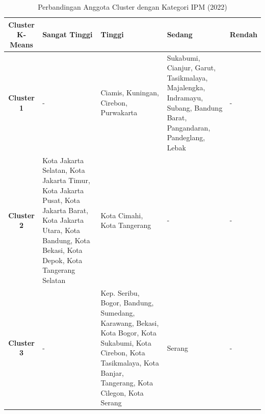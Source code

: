 \begin{table}[H]
\centering
\caption{Perbandingan Anggota Cluster dengan Kategori IPM (2022)} \label{tab:ipm_cross_2022}
\begin{tabular}{|c|p{2cm}|p{2cm}|p{2cm}|p{2cm}|}
\hline
\textbf{Cluster K-Means} & \textbf{Sangat Tinggi} & \textbf{Tinggi} & \textbf{Sedang} & \textbf{Rendah} \\ \hline
\textbf{Cluster 1} & - & Ciamis, Kuningan, Cirebon, Purwakarta & Sukabumi, Cianjur, Garut, Tasikmalaya, Majalengka, Indramayu, Subang, Bandung Barat, Pangandaran, Pandeglang, Lebak & - \\ \hline
\textbf{Cluster 2} & Kota Jakarta Selatan, Kota Jakarta Timur, Kota Jakarta Pusat, Kota Jakarta Barat, Kota Jakarta Utara, Kota Bandung, Kota Bekasi, Kota Depok, Kota Tangerang Selatan & Kota Cimahi, Kota Tangerang & - & - \\ \hline
\textbf{Cluster 3} & - & Kep. Seribu, Bogor, Bandung, Sumedang, Karawang, Bekasi, Kota Bogor, Kota Sukabumi, Kota Cirebon, Kota Tasikmalaya, Kota Banjar, Tangerang, Kota Cilegon, Kota Serang & Serang & - \\ \hline
\end{tabular}
\end{table}